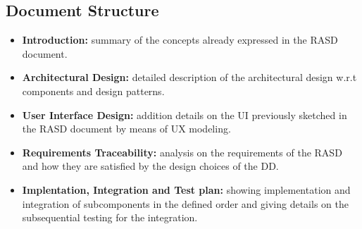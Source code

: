 \subsection{Document Structure}

\begin{itemize}

\item \textbf{Introduction:} summary of the concepts already expressed in the RASD document.
\item \textbf{Architectural Design:} detailed description of the architectural design w.r.t components and design patterns.
\item \textbf{User Interface Design:} addition details on the UI previously sketched in the RASD document by means of UX modeling.
\item \textbf{Requirements Traceability:} analysis on the requirements of the RASD and how they are satisfied by the design choices of the DD.
\item \textbf{Implentation, Integration and Test plan:} showing implementation and integration of subcomponents in the defined order and giving details on the subsequential testing for the integration.

\end{itemize}